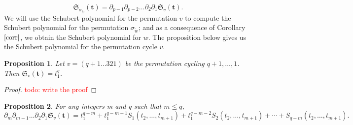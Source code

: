 \documentclass[11pt]{article}
\numberwithin{Property}{section}
\numberwithin{Theorem}{section}
\newtheorem{Proposition}{Proposition}%
\numberwithin{Proposition}{section}
\numberwithin{Lemma}{section}
\numberwithin{Corollary}{section}
\numberwithin{Definition}{section}
\numberwithin{Remark}{section}
\numberwithin{Conjecture}{section}
\numberwithin{Problem}{section}
\numberwithin{Example}{section}
\numberwithin{Claim}{section}
\renewcommand{\leq}{\leqslant}
\newcommand{\todo}[1]{\textcolor{red}{#1}} %
\begin{document}
\begin{equation} \label{esec72}
\mathfrak{S}_{\sigma_{\tilde{w}}}(\mathbf{t}) = \partial_{p-1}\partial_{p-2}\ldots\partial_2\partial_1\mathfrak{S}_v(\mathbf{t}).
\end{equation}
We will use the Schubert polynomial for the permutation $v$ to compute the Schubert polynomial for the permutation $\sigma_{\tilde{w}}$; and as a consequence of Corollary $\ref{corr}$, we obtain the Schubert polynomial for $w$. The proposition below gives us the Schubert polynomial for the permutation cycle $v$. 
\begin{Proposition}Let $v = (q+1 \ldots 321)$ be the permutation cycling $q+1, \ldots, 1$. Then $\mathfrak{S}_v(\mathbf{t}) = t_1^q$. 
\end{Proposition}
\begin{proof}
\todo{todo: write the proof}
\end{proof}
\begin{Proposition} \label{pp} For any integers m and q such that $m \leq q$,
\[ \partial_{m}\partial_{m-1}\ldots\partial_2\partial_1\mathfrak{S}_v(\mathbf{t}) = t_1^{q-m} + t_1^{q-m-1}S_1(t_2, \ldots, t_{m+1}) + t_1^{q-m-2}S_2(t_2, \ldots, t_{m+1}) + \cdots + S_{q-m}(t_2, \ldots, t_{m+1}). 
\]
\end{Proposition}
\end{document}
